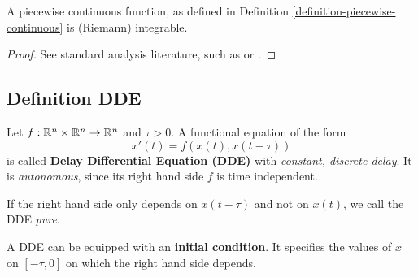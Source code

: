 \documentclass[10pt]{article}
\begin{document}

\begin{lemma}[]
    \label{lemma-piecewise-continuous-integrable}

    A piecewise continuous function, as defined in Definition \ref{definition-piecewise-continuous} is (Riemann) integrable.
\end{lemma}

\begin{proof}
    See standard analysis literature, such as \cite{rudin1976principles} or \cite{gathmanngrundlagen}.
\end{proof}



\subsection{Definition DDE} \label{sec:definition-dde}

\begin{definition}
    \label{definition-dde}

    Let $f:\mathbb{R}^n\times\mathbb{R}^n\rightarrow\mathbb{R}^n$ and $\tau > 0$.
    A functional equation of the form
    \begin{equation}
        x'(t) = f\left(x(t),x(t-\tau)\right)
    \end{equation}
    is called \textbf{Delay Differential Equation (DDE)} with \emph{constant, discrete delay}. It is \emph{autonomous}, since its right hand side $f$ is time independent.

    If the right hand side only depends on $x(t-\tau)$ and not on $x(t)$, we call the DDE \emph{pure}.

    A DDE can be equipped with an \textbf{initial condition}. It specifies the values of $x$ on $[-\tau, 0]$ on which the right hand side depends.

\end{definition}
\end{document}

